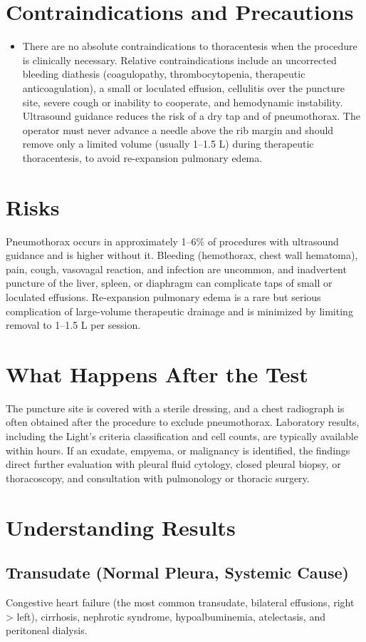 \section*{Contraindications and Precautions}
\begin{itemize}
  \item There are no absolute contraindications to thoracentesis when the procedure is clinically necessary. Relative contraindications include an uncorrected bleeding diathesis (coagulopathy, thrombocytopenia, therapeutic anticoagulation), a small or loculated effusion, cellulitis over the puncture site, severe cough or inability to cooperate, and hemodynamic instability. Ultrasound guidance reduces the risk of a dry tap and of pneumothorax. The operator must never advance a needle above the rib margin and should remove only a limited volume (usually 1--1.5 L) during therapeutic thoracentesis, to avoid re-expansion pulmonary edema.
\end{itemize}
\section*{Risks}
Pneumothorax occurs in approximately 1--6\% of procedures with ultrasound guidance and is higher without it. Bleeding (hemothorax, chest wall hematoma), pain, cough, vasovagal reaction, and infection are uncommon, and inadvertent puncture of the liver, spleen, or diaphragm can complicate taps of small or loculated effusions. Re-expansion pulmonary edema is a rare but serious complication of large-volume therapeutic drainage and is minimized by limiting removal to 1--1.5 L per session.
\section*{What Happens After the Test}
The puncture site is covered with a sterile dressing, and a chest radiograph is often obtained after the procedure to exclude pneumothorax. Laboratory results, including the Light's criteria classification and cell counts, are typically available within hours. If an exudate, empyema, or malignancy is identified, the findings direct further evaluation with pleural fluid cytology, closed pleural biopsy, or thoracoscopy, and consultation with pulmonology or thoracic surgery.
\section*{Understanding Results}
\subsection*{Transudate (Normal Pleura, Systemic Cause)}
Congestive heart failure (the most common transudate, bilateral effusions, right > left), cirrhosis, nephrotic syndrome, hypoalbuminemia, atelectasis, and peritoneal dialysis.
